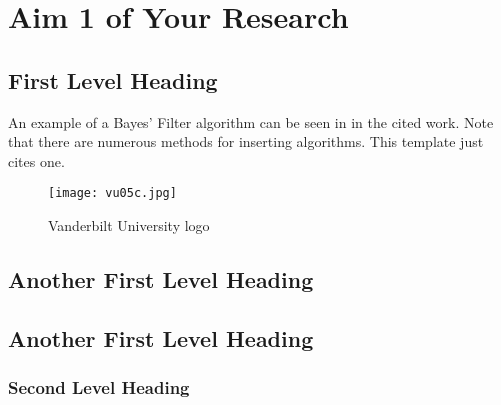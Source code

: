 \clearpage %

\chapter{Aim 1 of Your Research}\label{CH3_AIM1}


\section{First Level Heading}
An example of a Bayes' Filter \citep*{Thrun2005} algorithm can be seen in in the cited work. Note that there are numerous methods for inserting algorithms. This template just cites one.


\begin{figure}[h]
\centering
\texttt{[image: vu05c.jpg]}
 \caption{Vanderbilt University logo}
\end{figure}

\section{Another First Level Heading}
\section{Another First Level Heading}
\subsection{Second Level Heading}